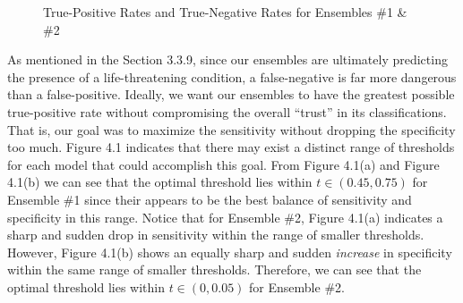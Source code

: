 \documentclass [MAS] {uclathes}
\begin{document}
\begin{figure}[hbt!]
\hspace*{\fill}
\centering
{}\hspace{0em}
\hspace*{\fill}
\label{fig:sens_spec}
\vspace{0cm}
\caption{True-Positive Rates and True-Negative Rates for Ensembles \#1 \& \#2}
\end{figure}


As mentioned in the Section 3.3.9, since our ensembles are ultimately predicting the presence of a life-threatening condition, a false-negative is far more dangerous than a false-positive. Ideally, we want our ensembles to have the greatest possible true-positive rate without compromising the overall ``trust'' in its classifications. That is, our goal was to maximize the sensitivity without dropping the specificity too much. Figure 4.1 indicates that there may exist a distinct range of thresholds for each model that could accomplish this goal. From Figure 4.1(a) and Figure 4.1(b) we can see that the optimal threshold lies within $t \in (0.45, 0.75)$ for Ensemble \#1 since their appears to be the best balance of sensitivity and specificity in this range. Notice that for Ensemble \#2, Figure 4.1(a) indicates a sharp and sudden drop in sensitivity within the range of smaller thresholds. However, Figure 4.1(b) shows an equally sharp and sudden \textit{increase} in specificity within the same range of smaller thresholds. Therefore, we can see that the optimal threshold lies within $t \in (0, 0.05)$ for Ensemble \#2.
\end{document}
